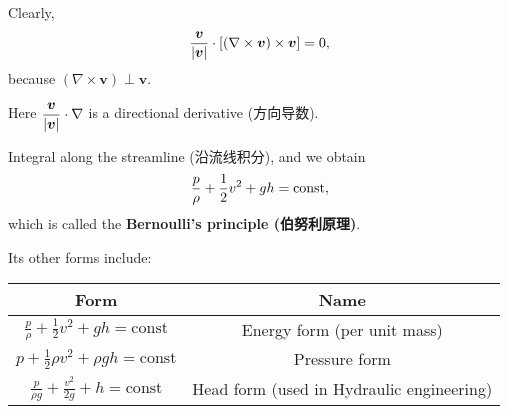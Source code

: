 Clearly,
\[{\boldsymbol v \over |\boldsymbol v|} \cdot \left[ \left(\nabla \times \boldsymbol v \right) \times \boldsymbol v \right] = 0,\]
because
\(\left(\nabla \times \boldsymbol v \right) \perp \boldsymbol v.\)

Here
\(\displaystyle {\boldsymbol v \over |\boldsymbol v|} \cdot \nabla\) is
a directional derivative (方向导数).

Integral along the streamline (沿流线积分), and we obtain
\[{p \over \rho} + {1 \over 2} v^2 + gh = \mathrm{const},\] which is
called the \textbf{Bernoulli's principle (伯努利原理)}.

Its other forms include: 

\begin{center}
    \begin{tabular}{|c|c|}
        \hline
        \textbf{Form} & \textbf{Name} \\
        \hline
        $\displaystyle \frac{p}{\rho} + \frac{1}{2} v^2 + gh = \mathrm{const}$ & Energy form (per unit mass) \\[1.5ex]
        \hline
        $\displaystyle p + \frac{1}{2} \rho v^2 + \rho g h = \mathrm{const}$ & Pressure form \\[1.5ex]
        \hline
        $\displaystyle \frac{p}{\rho g} + \frac{v^2}{2g} + h = \mathrm{const}$ & Head form (used in Hydraulic engineering) \\[1.5ex]
        \hline
    \end{tabular}
\end{center}
